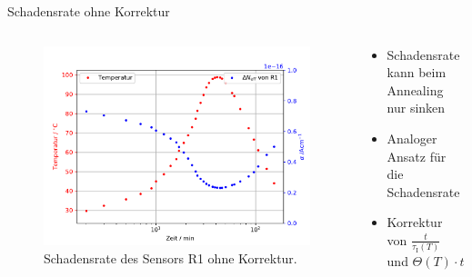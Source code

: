 \documentclass[aspectratio=43, 10pt]{beamer}
\begin{document}
\begin{frame}{Schadensrate ohne Korrektur}
  \begin{columns}
  \begin{column}{0.5\textwidth}
    \begin{figure}
        \includegraphics[width=1.0\textwidth]{images/damage_ohne_korrektur.PDF}
        \caption{Schadensrate des Sensors R1 ohne Korrektur.}
    \end{figure}
  \end{column}
  \begin{column}{0.5\textwidth}
  \begin{itemize}
    \item Schadensrate kann beim Annealing nur sinken
    \medskip
    \item Analoger Ansatz für die Schadensrate
    \medskip
    \item Korrektur von $\frac{t}{\tau_{\mathrm{I}}(T)}$ und  $\Theta(T) \cdot t$


  \end{itemize}
  \end{column}
  \end{columns}
\end{frame}
\end{document}
